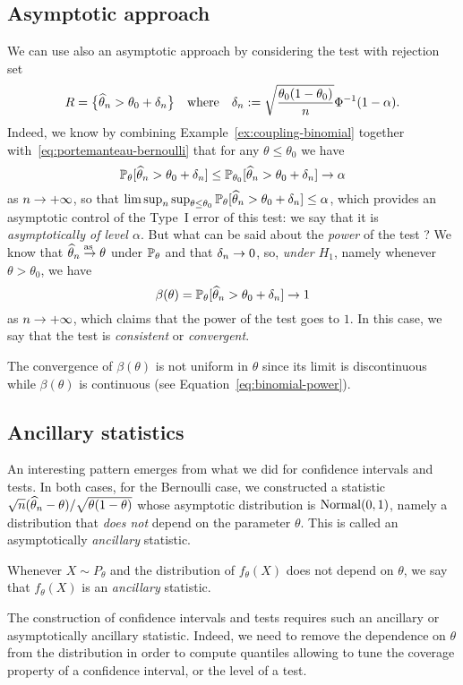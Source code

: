 \subsection{Asymptotic approach}

We can use also an asymptotic approach by considering the test with rejection set
\begin{equation*}
	R = \big\{ \wh \theta_n > \theta_0  + \delta_n \big\} \quad \text{where} \quad \delta_n	:= \sqrt{\frac{\theta_0 (1 - \theta_0)}{n}} \Phi^{-1}(1 - \alpha).
\end{equation*}
Indeed, we know by combining Example~\ref{ex:coupling-binomial} together with~\eqref{eq:portemanteau-bernoulli} that for any $\theta \leq \theta_0$ we have
\begin{equation*}
	\P_\theta[ \wh \theta_n > \theta_0  + \delta_n ] \leq \P_{\theta_0}[ \wh \theta_n > \theta_0  + \delta_n ] \goes \alpha
\end{equation*}
as $n \goes +\infty$, so that $\limsup_n \sup_{\theta \leq \theta_0} \P_\theta[ \wh \theta_n > \theta_0  + \delta_n ] \leq \alpha$, which provides an asymptotic control of the Type~I error of this test: we say that it is \emph{asymptotically of level $\alpha$}.
But what can be said about the \emph{power} of the test ?
We know that $\wh \theta_n \goas \theta$ under $\P_\theta$ and that $\delta_n \go 0$, so, \emph{under $H_1$}, namely whenever $\theta > \theta_0$, we have
\begin{equation*}
	\beta(\theta) = \P_\theta[ \wh \theta_n > \theta_0 + \delta_n] \go 1
\end{equation*}
as $n \go +\infty$, which claims that the power of the test goes to $1$.
In this case, we say that the test is \emph{consistent} or \emph{convergent}.
\begin{remark}
 	The convergence of $\beta(\theta)$ is not uniform in $\theta$ since its limit is discontinuous while $\beta(\theta)$ is continuous (see Equation~\eqref{eq:binomial-power}).
\end{remark}

\subsection{Ancillary statistics} %


An interesting pattern emerges from what we did for confidence intervals and tests.
In both cases, for the Bernoulli case, we constructed a statistic 
$\sqrt n (\wh \theta_n - \theta) / \sqrt{\theta (1 - \theta)}$ whose asymptotic distribution is $\nor(0, 1)$, namely a distribution that \emph{does not} depend on the parameter $\theta$.
This is called an asymptotically \emph{ancillary} statistic.
\begin{definition}
	Whenever $X \sim P_\theta$ and the distribution of $f_\theta(X)$ does not depend on $\theta$, we say that $f_\theta(X)$ is an \emph{ancillary} statistic.
\end{definition}
The construction of confidence intervals and tests requires such an ancillary or asymptotically ancillary statistic.
Indeed, we need to remove the dependence on $\theta$ from the distribution in order to compute quantiles allowing to tune the coverage property of a confidence interval, or the level of a test.


